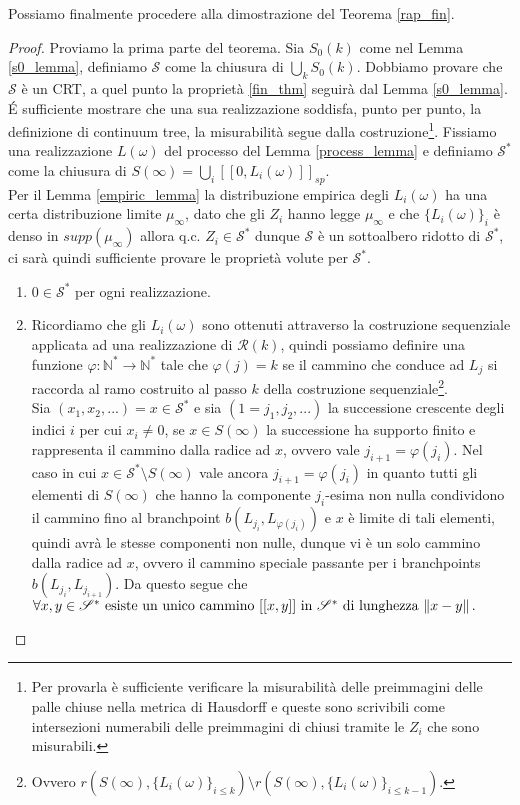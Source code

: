 \documentclass[11pt, twoside]{report}
\renewcommand{\phi}{\varphi}
\newcommand{\Ss}{\mathscr{S}}
\newcommand{\Rr}{\mathscr{R}}
\theoremstyle{definition}
\theoremstyle{plain}
\theoremstyle{remark}
\numberwithin{equation}{chapter}
\begin{document}
Possiamo finalmente procedere alla dimostrazione del Teorema \ref{rap_fin}.
\begin{proof}
Proviamo la prima parte del teorema. Sia $S_0(k)$ come nel Lemma \ref{s0_lemma}, definiamo $\Ss$ come la chiusura di $\bigcup_k S_0(k)$. Dobbiamo provare che $\Ss$ è un CRT, a quel punto la proprietà \eqref{fin_thm} seguirà dal Lemma \ref{s0_lemma}. \'E sufficiente mostrare che una sua realizzazione soddisfa, punto per punto, la definizione di continuum tree, la misurabilità segue dalla costruzione\footnote{Per provarla è sufficiente verificare la misurabilità delle preimmagini delle palle chiuse nella metrica di Hausdorff e queste sono scrivibili come intersezioni numerabili delle preimmagini di chiusi tramite le $Z_i$ che sono misurabili.}.
Fissiamo una realizzazione $L(\omega)$ del processo del Lemma \ref{process_lemma} e definiamo $\Ss^*$ come la chiusura di $S(\infty)=\bigcup_i[[0, L_i(\omega)]]_{sp}$.\\
Per il Lemma \ref{empiric_lemma} la distribuzione empirica degli $L_i(\omega)$ ha una certa distribuzione limite $\mu_\infty$, dato che gli $Z_i$ hanno legge $\mu_\infty$ e che $\{L_i(\omega)\}_i$ è denso in $supp(\mu_	\infty)$ allora q.c. $Z_i \in \Ss^*$ dunque $\Ss$ è un sottoalbero ridotto di $\Ss^*$, ci sarà quindi sufficiente provare le proprietà volute per $\Ss^*$.
\begin{enumerate}
\item $0 \in \Ss^*$ per ogni realizzazione.

\item 
Ricordiamo che gli $L_i(\omega)$ sono ottenuti attraverso la costruzione sequenziale applicata ad una realizzazione di $\Rr(k)$, quindi possiamo definire una funzione $\phi: \mathbb{N}^*\longrightarrow\mathbb{N}^*$ tale che $\phi(j)=k$ se il cammino che conduce ad $L_j$ si raccorda al ramo costruito al passo $k$ della costruzione sequenziale\footnote{Ovvero $r(S(\infty),\{L_i(\omega)\}_{i\leq k}) \setminus r(S(\infty),\{L_i(\omega)\}_{i\leq k-1})$.}.\\
Sia $(x_1, x_2, ...)= x \in \Ss^*$ e sia $(1=j_1,j_2, ...)$ la successione crescente degli indici $i$ per cui $x_i \neq 0$, se $x \in S(\infty)$ la successione ha supporto finito e rappresenta il cammino dalla radice ad $x$, ovvero vale $j_{i+1}=\phi(j_i)$. Nel caso in cui $x \in \Ss^* \setminus S(\infty)$ vale ancora $j_{i+1}=\phi(j_i)$ in quanto tutti gli elementi di $S(\infty)$   che hanno la componente $j_i$-esima non nulla condividono il cammino fino al branchpoint $b(L_{j_i}, L_{\phi(j_i)})$ e $x$ è limite di tali elementi, quindi avrà le stesse componenti non nulle, dunque vi è un solo cammino dalla radice ad $x$, ovvero il cammino speciale passante per i branchpoints $b(L_{j_i}, L_{j_{i+1}})$. Da questo segue che 
$\forall x,y \in \Ss^* \text{ esiste un unico cammino } [[x,y]] \text{ in } \Ss^* \text{ di lunghezza } \norm{x-y}.$


\end{enumerate}
\end{proof}
\end{document}
